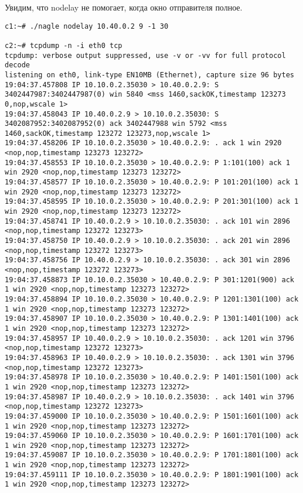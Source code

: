 \documentclass[a4paper,12pt]{article}
\begin{document}
Увидим, что nodelay не помогает, когда окно отправителя полное.

\begin{lstlisting}
c1:~# ./nagle nodelay 10.40.0.2 9 -1 30

c2:~# tcpdump -n -i eth0 tcp
tcpdump: verbose output suppressed, use -v or -vv for full protocol decode
listening on eth0, link-type EN10MB (Ethernet), capture size 96 bytes
19:04:37.457808 IP 10.10.0.2.35030 > 10.40.0.2.9: S 3402447987:3402447987(0) win 5840 <mss 1460,sackOK,timestamp 123273 0,nop,wscale 1>
19:04:37.458043 IP 10.40.0.2.9 > 10.10.0.2.35030: S 3402087952:3402087952(0) ack 3402447988 win 5792 <mss 1460,sackOK,timestamp 123272 123273,nop,wscale 1>
19:04:37.458206 IP 10.10.0.2.35030 > 10.40.0.2.9: . ack 1 win 2920 <nop,nop,timestamp 123273 123272>
19:04:37.458553 IP 10.10.0.2.35030 > 10.40.0.2.9: P 1:101(100) ack 1 win 2920 <nop,nop,timestamp 123273 123272>
19:04:37.458577 IP 10.10.0.2.35030 > 10.40.0.2.9: P 101:201(100) ack 1 win 2920 <nop,nop,timestamp 123273 123272>
19:04:37.458595 IP 10.10.0.2.35030 > 10.40.0.2.9: P 201:301(100) ack 1 win 2920 <nop,nop,timestamp 123273 123272>
19:04:37.458741 IP 10.40.0.2.9 > 10.10.0.2.35030: . ack 101 win 2896 <nop,nop,timestamp 123272 123273>
19:04:37.458750 IP 10.40.0.2.9 > 10.10.0.2.35030: . ack 201 win 2896 <nop,nop,timestamp 123272 123273>
19:04:37.458756 IP 10.40.0.2.9 > 10.10.0.2.35030: . ack 301 win 2896 <nop,nop,timestamp 123272 123273>
19:04:37.458873 IP 10.10.0.2.35030 > 10.40.0.2.9: P 301:1201(900) ack 1 win 2920 <nop,nop,timestamp 123273 123272>
19:04:37.458894 IP 10.10.0.2.35030 > 10.40.0.2.9: P 1201:1301(100) ack 1 win 2920 <nop,nop,timestamp 123273 123272>
19:04:37.458907 IP 10.10.0.2.35030 > 10.40.0.2.9: P 1301:1401(100) ack 1 win 2920 <nop,nop,timestamp 123273 123272>
19:04:37.458957 IP 10.40.0.2.9 > 10.10.0.2.35030: . ack 1201 win 3796 <nop,nop,timestamp 123272 123273>
19:04:37.458963 IP 10.40.0.2.9 > 10.10.0.2.35030: . ack 1301 win 3796 <nop,nop,timestamp 123272 123273>
19:04:37.458978 IP 10.10.0.2.35030 > 10.40.0.2.9: P 1401:1501(100) ack 1 win 2920 <nop,nop,timestamp 123273 123272>
19:04:37.458987 IP 10.40.0.2.9 > 10.10.0.2.35030: . ack 1401 win 3796 <nop,nop,timestamp 123272 123273>
19:04:37.459000 IP 10.10.0.2.35030 > 10.40.0.2.9: P 1501:1601(100) ack 1 win 2920 <nop,nop,timestamp 123273 123272>
19:04:37.459060 IP 10.10.0.2.35030 > 10.40.0.2.9: P 1601:1701(100) ack 1 win 2920 <nop,nop,timestamp 123273 123272>
19:04:37.459087 IP 10.10.0.2.35030 > 10.40.0.2.9: P 1701:1801(100) ack 1 win 2920 <nop,nop,timestamp 123273 123272>
19:04:37.459111 IP 10.10.0.2.35030 > 10.40.0.2.9: P 1801:1901(100) ack 1 win 2920 <nop,nop,timestamp 123273 123272>

\end{lstlisting}
\end{document}
